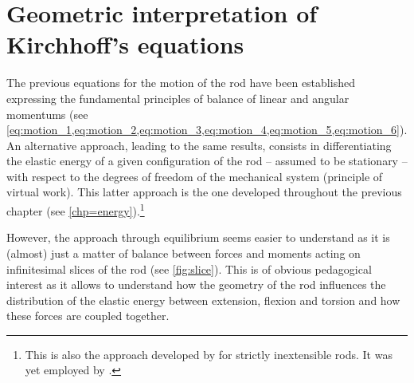 \section{Geometric interpretation of Kirchhoff's equations}\label{sec=geointerp}

The previous equations for the motion of the rod have been established expressing the fundamental principles of balance of linear and angular momentums (see \cref{eq:motion_1,eq:motion_2,eq:motion_3,eq:motion_4,eq:motion_5,eq:motion_6}). An alternative approach, leading to the same results, consists in differentiating the elastic energy of a given configuration of the rod -- assumed to be stationary -- with respect to the degrees of freedom of the mechanical system (principle of virtual work). This latter approach is the one developed throughout the previous chapter (see \cref{chp=energy}).\footnote{This is also the approach developed by  for strictly inextensible rods. It was yet employed by .}

However, the approach through equilibrium seems easier to understand as it is (almost) just a matter of balance between forces and moments acting on infinitesimal slices of the rod (see \cref{fig:slice}). This is of obvious pedagogical interest as it allows to understand how the geometry of the rod influences the distribution of the elastic energy between extension, flexion and torsion and how these forces are coupled together.

